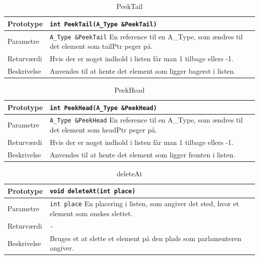 \begin{table}[ht]
\begin{tabularx}{\textwidth}{| L{2.5 cm} | Z |} \hline
Prototype & \texttt{int PeekTail(A\_Type \&PeekTail)} \\\hline
Parametre & \texttt{A\_Type \&PeekTail} \newline
En reference til en A\_Type, som ændres til det element som tailPtr peger på. \\\hline
Returværdi & Hvis der er noget indhold i listen får man 1 tilbage ellers -1. \\\hline
Beskrivelse & Anvendes til at hente det element som ligger bagerst i listen. \\\hline
\end{tabularx}
\caption{PeekTail}
\label{table:DoublyLinkedList_PeekTail}
\end{table}


\begin{table}[ht]
\begin{tabularx}{\textwidth}{| L{2.5 cm} | Z |} \hline
Prototype & \texttt{int PeekHead(A\_Type \&PeekHead)} \\\hline
Parametre & \texttt{A\_Type \&PeekHead} \newline
En reference til en A\_Type, som ændres til det element som headPtr peger på. \\\hline
Returværdi & Hvis der er noget indhold i listen får man 1 tilbage ellers -1. \\\hline
Beskrivelse & Anvendes til at hente det element som ligger fronten i listen. \\\hline
\end{tabularx}
\caption{PeekHead}
\label{table:DoublyLinkedList_PeekHead}
\end{table}


\begin{table}[ht]
\begin{tabularx}{\textwidth}{| L{2.5 cm} | Z |} \hline
Prototype & \texttt{void deleteAt(int place)} \\\hline
Parametre & \texttt{int place} \newline
En placering i listen, som angiver det sted, hvor et element som ønskes slettet. \\\hline
Returværdi & \texttt{-} \\\hline
Beskrivelse & Bruges et at slette et element på den plads som parlamenteren angiver. \\\hline
\end{tabularx}
\caption{deleteAt}
\label{table:DoublyLinkedList_deleteAt}
\end{table}


